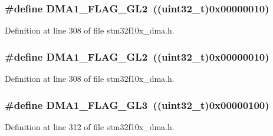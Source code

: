 \subsubsection[{\texorpdfstring{D\+M\+A1\+\_\+\+F\+L\+A\+G\+\_\+\+G\+L2}{DMA1_FLAG_GL2}}]{\setlength{\rightskip}{0pt plus 5cm}\#define D\+M\+A1\+\_\+\+F\+L\+A\+G\+\_\+\+G\+L2~(({\bf uint32\+\_\+t})0x00000010)}\hypertarget{group___d_m_a__flags__definition_gad27b8a0cf554638d78fb67a010c0419b}{}\label{group___d_m_a__flags__definition_gad27b8a0cf554638d78fb67a010c0419b}


Definition at line 308 of file stm32f10x\+\_\+dma.\+h.

\subsubsection[{\texorpdfstring{D\+M\+A1\+\_\+\+F\+L\+A\+G\+\_\+\+G\+L2}{DMA1_FLAG_GL2}}]{\setlength{\rightskip}{0pt plus 5cm}\#define D\+M\+A1\+\_\+\+F\+L\+A\+G\+\_\+\+G\+L2~(({\bf uint32\+\_\+t})0x00000010)}\hypertarget{group___d_m_a__flags__definition_gad27b8a0cf554638d78fb67a010c0419b}{}\label{group___d_m_a__flags__definition_gad27b8a0cf554638d78fb67a010c0419b}


Definition at line 308 of file stm32f10x\+\_\+dma.\+h.

\subsubsection[{\texorpdfstring{D\+M\+A1\+\_\+\+F\+L\+A\+G\+\_\+\+G\+L3}{DMA1_FLAG_GL3}}]{\setlength{\rightskip}{0pt plus 5cm}\#define D\+M\+A1\+\_\+\+F\+L\+A\+G\+\_\+\+G\+L3~(({\bf uint32\+\_\+t})0x00000100)}\hypertarget{group___d_m_a__flags__definition_gaf3eccffb15e5b64611774b22f8b43e91}{}\label{group___d_m_a__flags__definition_gaf3eccffb15e5b64611774b22f8b43e91}


Definition at line 312 of file stm32f10x\+\_\+dma.\+h.

